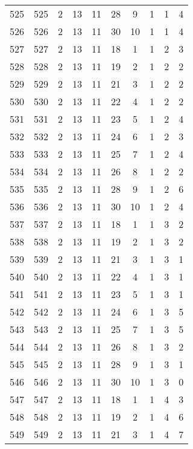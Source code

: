 \begin{longtable}{cccccccccc}
  525 & 525 &   2 &  13 &  11 &  28 &   9 &   1 &   1 &   4 \\ 
  526 & 526 &   2 &  13 &  11 &  30 &  10 &   1 &   1 &   4 \\ 
  527 & 527 &   2 &  13 &  11 &  18 &   1 &   1 &   2 &   3 \\ 
  528 & 528 &   2 &  13 &  11 &  19 &   2 &   1 &   2 &   2 \\ 
  529 & 529 &   2 &  13 &  11 &  21 &   3 &   1 &   2 &   2 \\ 
  530 & 530 &   2 &  13 &  11 &  22 &   4 &   1 &   2 &   2 \\ 
  531 & 531 &   2 &  13 &  11 &  23 &   5 &   1 &   2 &   4 \\ 
  532 & 532 &   2 &  13 &  11 &  24 &   6 &   1 &   2 &   3 \\ 
  533 & 533 &   2 &  13 &  11 &  25 &   7 &   1 &   2 &   4 \\ 
  534 & 534 &   2 &  13 &  11 &  26 &   8 &   1 &   2 &   2 \\ 
  535 & 535 &   2 &  13 &  11 &  28 &   9 &   1 &   2 &   6 \\ 
  536 & 536 &   2 &  13 &  11 &  30 &  10 &   1 &   2 &   4 \\ 
  537 & 537 &   2 &  13 &  11 &  18 &   1 &   1 &   3 &   2 \\ 
  538 & 538 &   2 &  13 &  11 &  19 &   2 &   1 &   3 &   2 \\ 
  539 & 539 &   2 &  13 &  11 &  21 &   3 &   1 &   3 &   1 \\ 
  540 & 540 &   2 &  13 &  11 &  22 &   4 &   1 &   3 &   1 \\ 
  541 & 541 &   2 &  13 &  11 &  23 &   5 &   1 &   3 &   1 \\ 
  542 & 542 &   2 &  13 &  11 &  24 &   6 &   1 &   3 &   5 \\ 
  543 & 543 &   2 &  13 &  11 &  25 &   7 &   1 &   3 &   5 \\ 
  544 & 544 &   2 &  13 &  11 &  26 &   8 &   1 &   3 &   2 \\ 
  545 & 545 &   2 &  13 &  11 &  28 &   9 &   1 &   3 &   1 \\ 
  546 & 546 &   2 &  13 &  11 &  30 &  10 &   1 &   3 &   0 \\ 
  547 & 547 &   2 &  13 &  11 &  18 &   1 &   1 &   4 &   3 \\ 
  548 & 548 &   2 &  13 &  11 &  19 &   2 &   1 &   4 &   6 \\ 
  549 & 549 &   2 &  13 &  11 &  21 &   3 &   1 &   4 &   7 \\ 

\end{longtable}
